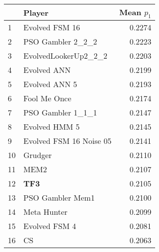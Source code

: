 \begin{tabular}{llr}
\toprule
{} &                   Player &  Mean $p_1$ \\
\midrule
1  &           Evolved FSM 16 &      0.2274 \\
2  &        PSO Gambler 2\_2\_2 &      0.2223 \\
3  &     EvolvedLookerUp2\_2\_2 &      0.2203 \\
4  &              Evolved ANN &      0.2199 \\
5  &            Evolved ANN 5 &      0.2193 \\
6  &             Fool Me Once &      0.2174 \\
7  &        PSO Gambler 1\_1\_1 &      0.2147 \\
8  &            Evolved HMM 5 &      0.2145 \\
9  &  Evolved FSM 16 Noise 05 &      0.2141 \\
10 &                  Grudger &      0.2110 \\
11 &                     MEM2 &      0.2107 \\
12 &                      \textbf{TF3} &      0.2105 \\
13 &         PSO Gambler Mem1 &      0.2100 \\
14 &              Meta Hunter &      0.2099 \\
15 &            Evolved FSM 4 &      0.2081 \\
16 &                       CS &      0.2063 \\
\bottomrule
\end{tabular}
